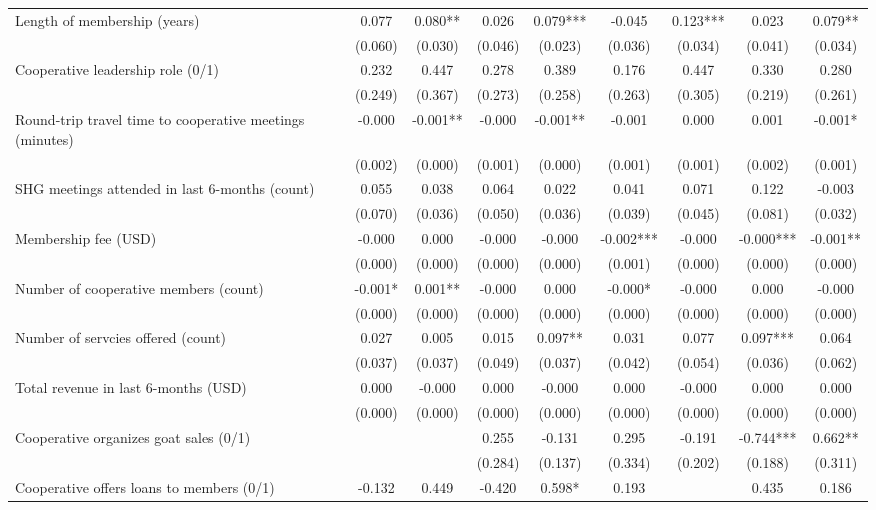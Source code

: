 \documentclass[11pt]{article}
\begin{document}
\begin{landscape}
\begin{table}[H]
{\begin{tabularx}{1.8\linewidth}{lcccccccc}
Length of membership (years) & 0.077 & 0.080** & 0.026 & 0.079*** & -0.045 & 0.123*** & 0.023 & 0.079** \\
 & (0.060) & (0.030) & (0.046) & (0.023) & (0.036) & (0.034) & (0.041) & (0.034) \\
Cooperative leadership role (0/1) & 0.232 & 0.447 & 0.278 & 0.389 & 0.176 & 0.447 & 0.330 & 0.280 \\
 & (0.249) & (0.367) & (0.273) & (0.258) & (0.263) & (0.305) & (0.219) & (0.261) \\
Round-trip travel time to cooperative meetings (minutes) & -0.000 & -0.001** & -0.000 & -0.001** & -0.001 & 0.000 & 0.001 & -0.001* \\
 & (0.002) & (0.000) & (0.001) & (0.000) & (0.001) & (0.001) & (0.002) & (0.001) \\
SHG meetings attended in last 6-months (count) & 0.055 & 0.038 & 0.064 & 0.022 & 0.041 & 0.071 & 0.122 & -0.003 \\
 & (0.070) & (0.036) & (0.050) & (0.036) & (0.039) & (0.045) & (0.081) & (0.032) \\
Membership fee (USD) & -0.000 & 0.000 & -0.000 & -0.000 & -0.002*** & -0.000 & -0.000*** & -0.001** \\
 & (0.000) & (0.000) & (0.000) & (0.000) & (0.001) & (0.000) & (0.000) & (0.000) \\
Number of cooperative members (count) & -0.001* & 0.001** & -0.000 & 0.000 & -0.000* & -0.000 & 0.000 & -0.000 \\
 & (0.000) & (0.000) & (0.000) & (0.000) & (0.000) & (0.000) & (0.000) & (0.000) \\
Number of servcies offered (count) & 0.027 & 0.005 & 0.015 & 0.097** & 0.031 & 0.077 & 0.097*** & 0.064 \\
 & (0.037) & (0.037) & (0.049) & (0.037) & (0.042) & (0.054) & (0.036) & (0.062) \\
Total revenue in last 6-months (USD) & 0.000 & -0.000 & 0.000 & -0.000 & 0.000 & -0.000 & 0.000 & 0.000 \\
 & (0.000) & (0.000) & (0.000) & (0.000) & (0.000) & (0.000) & (0.000) & (0.000) \\
Cooperative organizes goat sales (0/1) &  &  & 0.255 & -0.131 & 0.295 & -0.191 & -0.744*** & 0.662** \\
 &  &  & (0.284) & (0.137) & (0.334) & (0.202) & (0.188) & (0.311) \\
Cooperative offers loans to members (0/1) & -0.132 & 0.449 & -0.420 & 0.598* & 0.193 &  & 0.435 & 0.186 \\

\end{tabularx}}
\end{table}
\end{landscape}
\end{document}

